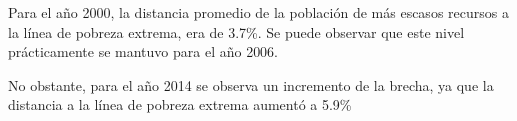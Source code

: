 Para el año 2000, la distancia promedio de la población de más escasos recursos a la línea de pobreza extrema, era de 3.7\%. Se puede observar que este nivel prácticamente se mantuvo para el año 2006. 

No obstante, para el año 2014 se observa un incremento de la brecha, ya que la distancia a la línea de pobreza extrema aumentó a 5.9\%